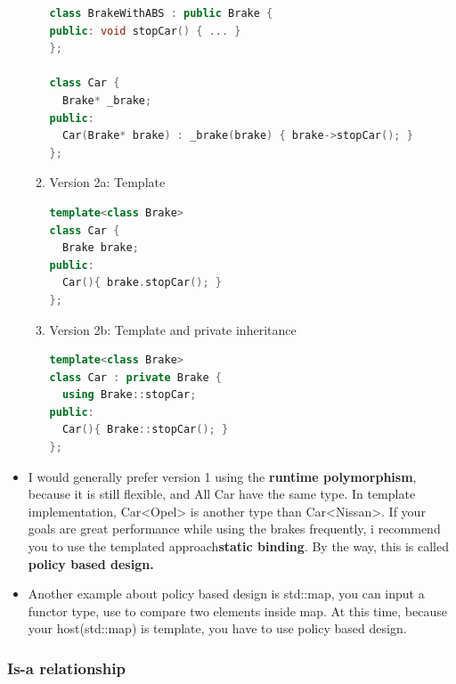 \documentclass[a4paper,12pt,twoside]{book}
\begin{document}
\begin{itemize}
\begin{enumerate}
\begin{lstlisting}[frame=single, language=c++]
class BrakeWithABS : public Brake {
public: void stopCar() { ... }
};

class Car {
  Brake* _brake;
public:
  Car(Brake* brake) : _brake(brake) { brake->stopCar(); }
};
\end{lstlisting}

\item Version 2a: Template

\begin{lstlisting}[frame=single, language=c++]
template<class Brake>
class Car {
  Brake brake;
public:
  Car(){ brake.stopCar(); }
};

\end{lstlisting}
\item Version 2b: Template and private inheritance
\begin{lstlisting}[frame=single, language=c++]
template<class Brake>
class Car : private Brake {
  using Brake::stopCar;
public:
  Car(){ Brake::stopCar(); }
};
\end{lstlisting}
\end{enumerate}

\item I would generally prefer version 1 using the \textbf{runtime polymorphism}, because it is still flexible, and All Car  have the same type. In template implementation,  Car<Opel> is another type than Car<Nissan>. If your goals are great performance while using the brakes frequently, i recommend you to use the templated approach\textbf{static binding}. By the way, this is called \textbf{policy based design.}

\item Another example about policy based design is std::map, you can input a functor type, use to compare two elements inside map. At this time, because your host(std::map) is template, you have to use policy based design.
\end{itemize}

\subsubsection{Is-a relationship}
\end{document}
